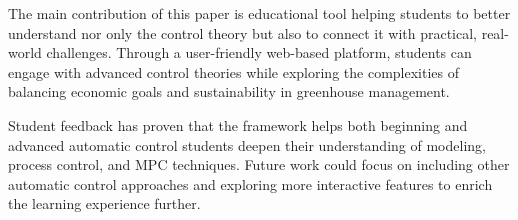 \documentclass[conference]{IEEEtran}
\begin{document}
The main contribution of this paper is educational tool helping students to better understand nor only the control theory but also to connect it with practical, real-world challenges. Through a user-friendly web-based platform, students can engage with advanced control theories while exploring the complexities of balancing economic goals and sustainability in greenhouse management. 

Student feedback has proven that the framework helps both beginning and advanced automatic control students deepen their understanding of modeling, process control, and MPC techniques. Future work could focus on including other automatic control approaches and exploring more interactive features to enrich the learning experience further.



\end{document}
